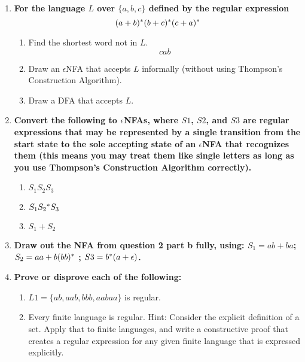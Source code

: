 

\begin{enumerate}

\item \textbf{For the language $L$ over $\{a,b,c\}$ defined by the regular expression} $$(a+b){}^\ast(b+c){}^\ast(c+a){}^\ast$$

\begin{enumerate}
    \item Find the shortest word not in $L$.
    $$cab$$
    \item Draw an $\epsilon$NFA that accepts $L$ informally (without using Thompson's Construction Algorithm).
    \item Draw a DFA that accepts $L$.

\end{enumerate}

\newpage

\item \textbf{Convert the following to $\epsilon$NFAs, where $S1$, $S2$, and
    $S3$ are regular expressions that may be represented by a single
    transition from the start state to the sole accepting state of an
    $\epsilon$NFA that recognizes them (this means you may treat them like
    single letters as long as you use Thompson's Construction Algorithm correctly).}

\begin{enumerate}
    \item $S_1 S_2 S_3$
    \item $S_1 S_2 {}^\ast S_3$
    \item $S_1 + S_2$

\end{enumerate}

\newpage

\item \textbf{Draw out the NFA from question 2 part b fully,
    using:  $S_1 = ab+ba$;  $S_2 = aa+b(bb){}^\ast$ ;
    $S3 = b{}^\ast (a+ \epsilon)$.}


\newpage
\item \textbf{Prove or disprove each of the following:}

\begin{enumerate}
    \item $L1 = \{ab, aab, bbb, aabaa\}$ is regular.
    \item Every finite language is regular. Hint: Consider the explicit definition of a set. Apply that to finite languages, and write a constructive proof that creates a regular expression for any given finite language that is expressed explicitly.


\end{enumerate}
\end{enumerate}
